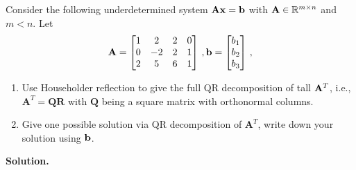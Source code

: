 \documentclass[english,onecolumn]{IEEEtran}
\def\Q{\mathbf{Q}}
\def\A{\mathbf{A}}
\def\R{\mathbf{R}}
\begin{document}
Consider the following underdetermined system ${\bf Ax}={\bf b}$ with ${\bf A}\in \mathbb{R}^{m\times n}$ and $m<n$. Let 
    \[
    {\bf A}=
    \begin{bmatrix}
         1&2&2&0\\
         0&-2&2&1\\
         2&5&6&1
    \end{bmatrix}\,,
    {\bf b}=
    \begin{bmatrix}
        b_1\\b_2\\b_3
    \end{bmatrix}\,,
    \]
\begin{enumerate}
    \item Use Householder reflection to give the full QR decomposition of tall ${\bf A}^T$, i.e., $\A^T= \Q\R$ with $\Q$ being a square matrix with orthonormal columns.
    \item Give one possible solution via QR decomposition of $\A^T$, write down your solution using $\bf{b}$.
\end{enumerate}
\noindent
\textbf{Solution.}
\end{document}
